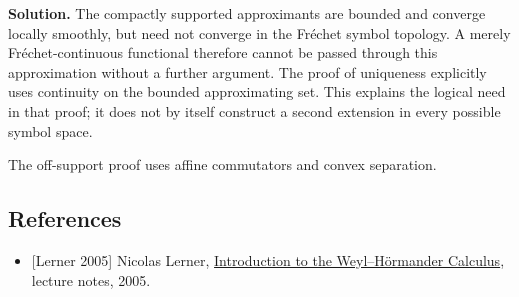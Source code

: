 \documentclass[
  11pt,
]{article}
\providecommand{\tightlist}{%
  \setlength{\itemsep}{0pt}\setlength{\parskip}{0pt}}
\begin{document}
\textbf{Solution.} The compactly supported approximants are bounded and
converge locally smoothly, but need not converge in the Fréchet symbol
topology. A merely Fréchet-continuous functional therefore cannot be
passed through this approximation without a further argument. The proof
of uniqueness explicitly uses continuity on the bounded approximating
set. This explains the logical need in that proof; it does not by itself
construct a second extension in every possible symbol space.

The off-support proof uses affine commutators and convex separation.

\subsection{References}\label{references}

\begin{itemize}
\tightlist
\item
  {[}Lerner 2005{]} Nicolas Lerner,
  \href{https://webusers.imj-prg.fr/~nicolas.lerner/PSEUDO.2005.pdf}{Introduction
  to the Weyl--Hörmander Calculus}, lecture notes, 2005.
\end{itemize}
\end{document}
